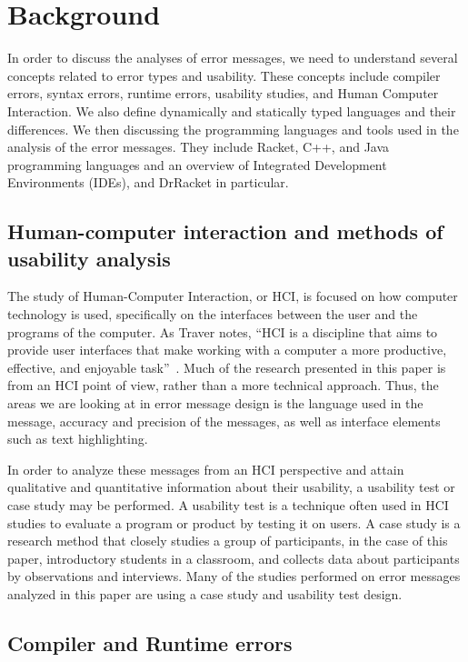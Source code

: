 \documentclass{sig-alternate}
\begin{document}
\section{Background}\label{sec:background}
In order to discuss the analyses of error messages, we need to understand several concepts related to error types and usability.
These concepts include compiler errors, syntax errors, runtime errors, usability studies, and Human Computer Interaction.
We also define dynamically and statically typed languages and their differences.
We then discussing the programming languages and tools used in the analysis of the error messages.
They include Racket, C++, and Java programming languages and an overview of Integrated Development Environments (IDEs), and DrRacket in particular.


\subsection{Human-computer interaction and methods of usability analysis}\label{subsec:hci}

The study of Human-Computer Interaction, or HCI, is focused on how computer technology is used, specifically on the interfaces between the user and the programs of the computer.
As Traver notes, ``HCI is a discipline that aims to provide user interfaces that make working with a computer a more productive, effective, and enjoyable task''~\cite{Traver:2010}.
Much of the research presented in this paper is from an HCI point of view, rather than a more technical approach.
Thus, the areas we are looking at in error message design is the language used in the message, accuracy and precision of the messages, as well as interface elements such as text highlighting.

In order to analyze these messages from an HCI perspective and attain qualitative and quantitative information about their usability, a usability test or case study may be performed.
A usability test is a technique often used in HCI studies to evaluate a program or product by testing it on users.
A case study is a research method that closely studies a group of participants, in the case of this paper, introductory students in a classroom, and collects data about participants by observations and interviews.
Many of the studies performed on error messages analyzed in this paper are using a case study and usability test design. 

\subsection{Compiler and Runtime errors}\label{subsec:error types}
\end{document}
